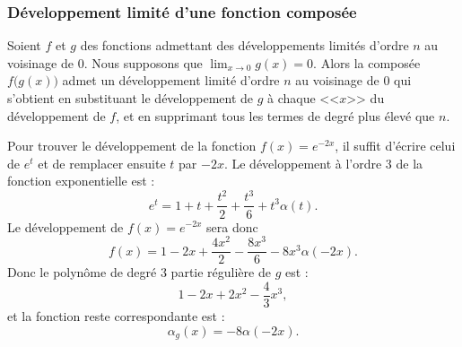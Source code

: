 \subsubsection{Développement limité d'une fonction composée}


\begin{proposition}
    Soient \( f\) et \( g\) des fonctions admettant des développements limités d'ordre $n$ au voisinage de $0$. Nous supposons que \( \lim_{x\to 0} g(x)=0\). Alors la composée \( f\big( g(x) \big)\) admet un développement limité d'ordre $n$ au voisinage de $0$ qui s'obtient en substituant le développement de \( g\) à chaque <<\(x \)>> du développement de \( f\), et en supprimant tous les termes de degré plus élevé que $n$.
\end{proposition}

\begin{example}\label{compose1}
    Pour trouver le développement de la fonction \( f(x)= e^{-2x}\), il suffit d'écrire celui de \( e^t\) et de remplacer ensuite $t$ par \( -2x\). Le développement à l'ordre \( 3\) de la fonction exponentielle est :
    \begin{equation}
        e^t=1+t+\frac{ t^2 }{2}+\frac{ t^3 }{ 6 }+t^3\alpha(t).
    \end{equation}
    Le développement de \( f(x)= e^{-2x}\) sera donc 
    \begin{equation}
        f(x)=1-2x+\frac{ 4x^2 }{ 2 }-\frac{ 8x^3 }{ 6 }-8x^3\alpha(-2x).
    \end{equation}
    Donc le polynôme de degré \( 3\) partie régulière de \( g\) est :
    \begin{equation}
        1-2x+2x^2-\frac{ 4 }{ 3 }x^3,
    \end{equation}
    et la fonction reste correspondante est :
    \begin{equation}
        \alpha_g(x)=-8\alpha(-2x).
    \end{equation}
\end{example}

